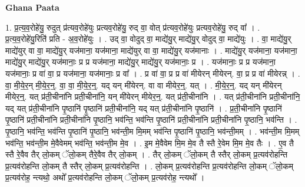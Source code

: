 \documentclass[17pt]{extarticle}
\begin{document}
\textbf{Ghana Paata } \newline

1. प्र॒त्य॒व॒रोहे॑यु॒ रुदुत् प्र॑त्यव॒रोहे॑युः प्रत्यव॒रोहे॑यु॒ रुद् वा॒ वोत् प्र॑त्यव॒रोहे॑युः प्रत्यव॒रोहे॑यु॒ रुद् वा᳚ । . प्र॒त्य॒व॒रोहे॑यु॒रिति॑ प्रति - अ॒व॒रोहे॑युः । . उद् वा॒ वोदुद् वा॒ माद्ये॑यु॒र् माद्ये॑यु॒र् वोदुद् वा॒ माद्ये॑युः । . वा॒ माद्ये॑यु॒र् माद्ये॑युर् वा वा॒ माद्ये॑यु॒र् यज॑माना॒ यज॑माना॒ माद्ये॑युर् वा वा॒ माद्ये॑यु॒र् यज॑मानाः । . माद्ये॑यु॒र् यज॑माना॒ यज॑माना॒ माद्ये॑यु॒र् माद्ये॑यु॒र् यज॑मानाः॒ प्र प्र यज॑माना॒ माद्ये॑यु॒र् माद्ये॑यु॒र् यज॑मानाः॒ प्र । . यज॑मानाः॒ प्र प्र यज॑माना॒ यज॑मानाः॒ प्र वा॑ वा॒ प्र यज॑माना॒ यज॑मानाः॒ प्र वा᳚ । . प्र वा॑ वा॒ प्र प्र वा॑ मीयेरन् मीयेरन्. वा॒ प्र प्र वा॑ मीयेरन्न् । . वा॒ मी॒ये॒र॒न् मी॒ये॒र॒न्॒. वा॒ वा॒ मी॒ये॒र॒न्॒. यद् यन् मी॑येरन्. वा वा मीयेर॒न्॒. यत् । . मी॒ये॒र॒न्॒. यद् यन् मी॑येरन् मीयेर॒न्॒. यत् प्र॑ती॒चीना॑नि प्रती॒चीना॑नि॒ यन् मी॑येरन् मीयेर॒न्॒. यत् प्र॑ती॒चीना॑नि । . यत् प्र॑ती॒चीना॑नि प्रती॒चीना॑नि॒ यद् यत् प्र॑ती॒चीना॑नि पृ॒ष्ठानि॑ पृ॒ष्ठानि॑ प्रती॒चीना॑नि॒ यद् यत् प्र॑ती॒चीना॑नि पृ॒ष्ठानि॑ । . प्र॒ती॒चीना॑नि पृ॒ष्ठानि॑ पृ॒ष्ठानि॑ प्रती॒चीना॑नि प्रती॒चीना॑नि पृ॒ष्ठानि॒ भव॑न्ति॒ भव॑न्ति पृ॒ष्ठानि॑ प्रती॒चीना॑नि प्रती॒चीना॑नि पृ॒ष्ठानि॒ भव॑न्ति । . पृ॒ष्ठानि॒ भव॑न्ति॒ भव॑न्ति पृ॒ष्ठानि॑ पृ॒ष्ठानि॒ भव॑न्ती॒म मि॒मम् भव॑न्ति पृ॒ष्ठानि॑ पृ॒ष्ठानि॒ भव॑न्ती॒मम् । . भव॑न्ती॒म मि॒मम् भव॑न्ति॒ भव॑न्ती॒म मे॒वैवेमम् भव॑न्ति॒ भव॑न्ती॒म मे॒व । . इ॒म मे॒वैवेम मि॒म मे॒व तै स्तै रे॒वेम मि॒म मे॒व तैः । . ए॒व तै स्तै रे॒वैव तैर् लो॒कम् ॅलो॒कम् तैरे॒वैव तैर् लो॒कम् । . तैर् लो॒कम् ॅलो॒कम् तै स्तैर् लो॒कम् प्र॒त्यव॑रोहन्ति प्र॒त्यव॑रोहन्ति लो॒कम् तै स्तैर् लो॒कम् प्र॒त्यव॑रोहन्ति । . लो॒कम् प्र॒त्यव॑रोहन्ति प्र॒त्यव॑रोहन्ति लो॒कम् ॅलो॒कम् प्र॒त्यव॑रोह॒ न्त्यथो॒ अथो᳚ प्र॒त्यव॑रोहन्ति लो॒कम् ॅलो॒कम् प्र॒त्यव॑रोह॒ न्त्यथो᳚ । \newline
\end{document}
